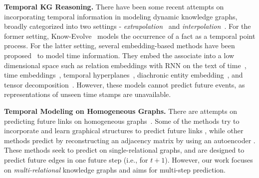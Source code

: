 \documentclass[11pt,a4paper]{article}
\newcommand{\para}[1]{\smallskip\noindent\textbf{#1}}
\begin{document}
\para{Temporal KG Reasoning.}
There have been some recent attempts on incorporating temporal information in modeling dynamic knowledge graphs, broadly categorized into two settings - \textit{extrapolation}~\citep{Trivedi2017KnowEvolveDT} and \textit{interpolation}~\citep{GarcaDurn2018LearningSE,leblay2018deriving,Dasgupta2018HyTEHT,goel2020diachronic,Lacroix2020Tensor}.
For the former setting, Know-Evolve~\citep{Trivedi2017KnowEvolveDT} models the occurrence of a fact as a temporal point process. 
For the latter setting, several embedding-based methods have been proposed~\citep{GarcaDurn2018LearningSE,leblay2018deriving,Dasgupta2018HyTEHT,goel2020diachronic,Lacroix2020Tensor} to model time information.
They embed the associate into a low dimensional space such as relation embeddings with RNN on the text of time~\citep{GarcaDurn2018LearningSE}, time embeddings~\citep{leblay2018deriving}, temporal hyperplanes~\citep{leblay2018deriving}, diachronic entity embedding~\citep{goel2020diachronic}, and tensor decomposition~\citep{Lacroix2020Tensor}.
However, these models cannot predict future events, as representations of unseen time stamps are unavailable.



\para{Temporal Modeling on Homogeneous Graphs.}
There are attempts on predicting future links on homogeneous graphs~\citep{Pareja2019EvolveGCNEG,goyal2018dyngem,goyal2019dyngraph2vec,zhou2018dynamic,singer2019node}.
Some of the methods try to incorporate and learn graphical structures to predict future links \citep{Pareja2019EvolveGCNEG,zhou2018dynamic,singer2019node}, while other methods predict by reconstructing an adjacency matrix by using an autoencoder \citep{goyal2018dyngem,goyal2019dyngraph2vec}.
These methods seek to predict on single-relational graphs, and are designed to predict future edges in one future step (i.e., for $t+1$).
However, our work focuses on \textit{multi-relational} knowledge graphs and aims for multi-step prediction.
\end{document}
